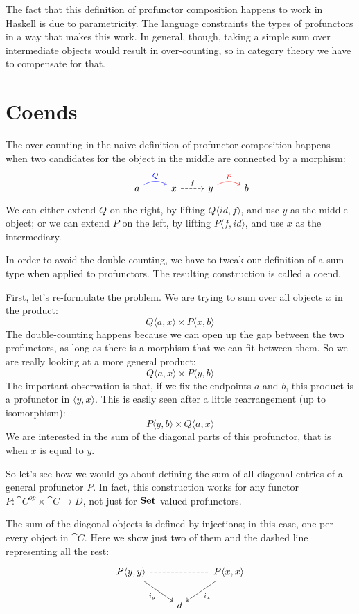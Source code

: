 \documentclass[DaoFP]{subfiles}
\begin{document}
The fact that this definition of profunctor composition happens to work in Haskell is due to parametricity. The language constraints the types of profunctors in a way that makes this work. In general, though, taking a simple sum over intermediate objects would result in over-counting, so in category theory we have to compensate for that.

\section{Coends}

The over-counting in the naive definition of profunctor composition happens when two candidates for the object in the middle are connected by a morphism:
\[
 \begin{tikzcd}
  & a
  \arrow[r, bend left, blue, "Q"]
  &x
  \arrow[r, dashed, "f"]
 & y
  \arrow[r, bend left, red, "P"]
 & b
  \end{tikzcd}
\]
We can either extend $Q$ on the right, by lifting $Q \langle id, f \rangle$, and use $y$ as the middle object; or we can extend $P$ on the left, by lifting $P \langle f, id \rangle$, and use $x$ as the intermediary.

In order to avoid the double-counting, we have to tweak our definition of a sum type when applied to profunctors. The resulting construction is called a coend. 

First, let's re-formulate the problem. We are trying to sum over all objects $x$ in the product:
\[ Q \langle a, x \rangle \times P \langle x, b \rangle \]
The double-counting happens because we can open up the gap between the two profunctors, as long as there is a morphism that we can fit between them. So we are really looking at a more general product:
\[ Q \langle a, x \rangle \times P \langle y, b \rangle \]
The important observation is that, if we fix the endpoints $a$ and $b$, this product is a profunctor in $\langle y, x \rangle$. This is easily seen after a little rearrangement (up to isomorphism):
\[ P \langle y, b \rangle \times Q \langle a, x \rangle \]
We are interested in the sum of the diagonal parts of this profunctor, that is when $x$ is equal to $y$. 

So let's see how we would go about defining the sum of all diagonal entries of a general profunctor $P$. In fact, this construction works for any functor $P \colon \cat C^{op} \times \cat C \to D$, not just for $\mathbf{Set}$-valued profunctors. 

The sum of the diagonal objects is defined by injections; in this case, one per every object in $\cat C$. Here we show just two of them and the dashed line representing all the rest:
\[
 \begin{tikzcd}
 P \langle y, y \rangle
 \arrow[dr, "i_y"']
 \arrow[rr, dash, dashed]
 &&P \langle x, x \rangle
 \arrow[dl, "i_x"]
 \\
 & d
 \end{tikzcd}
\]
\end{document}

